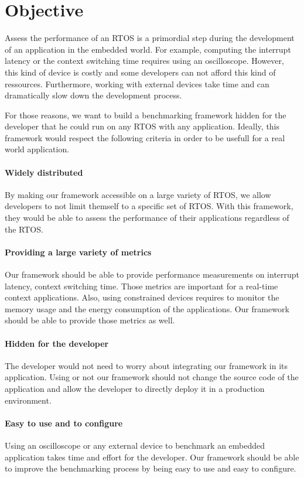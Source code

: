 \section{Objective}

Assess the performance of an RTOS is a primordial step during the development of an application in the embedded world.
For example, computing the interrupt latency or the context switching time requires using an oscilloscope.
However, this kind of device is costly and some developers can not afford this kind of ressources.
Furthermore, working with external devices take time and can dramatically slow down the development process.

For those reasons, we want to build a benchmarking framework hidden for the developer that he could run on any RTOS with any application.
Ideally, this framework would respect the following criteria in order to be usefull for a real world application.

\paragraph{Widely distributed}
By making our framework accessible on a large variety of RTOS, we allow developers to not limit themself to a specific set of RTOS.
With this framework, they would be able to assess the performance of their applications regardless of the RTOS.

\paragraph{Providing a large variety of metrics}
Our framework should be able to provide performance measurements on interrupt latency, context switching time.
Those metrics are important for a real-time context applications.
Also, using constrained devices requires to monitor the memory usage and the energy consumption of the applications.
Our framework should be able to provide those metrics as well.

\paragraph{Hidden for the developer}
The developer would not need to worry about integrating our framework in its application.
Using or not our framework should not change the source code of the application and allow the developer to directly deploy it in a production environment.

\paragraph{Easy to use and to configure}
Using an oscilloscope or any external device to benchmark an embedded application takes time and effort for the developer.
Our framework should be able to improve the benchmarking process by being easy to use and easy to configure.

